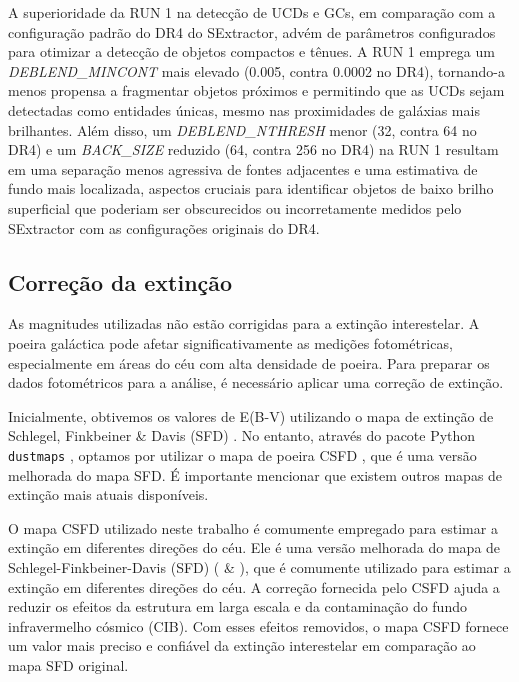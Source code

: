 A superioridade da RUN 1 na detecção de UCDs e GCs, em comparação com a configuração padrão do DR4 do SExtractor, advém de parâmetros configurados para otimizar a detecção de objetos compactos e tênues. A RUN 1 emprega um \textit{DEBLEND\_MINCONT} mais elevado (0.005, contra 0.0002 no DR4), tornando-a menos propensa a fragmentar objetos próximos e permitindo que as UCDs sejam detectadas como entidades únicas, mesmo nas proximidades de galáxias mais brilhantes. Além disso, um \textit{DEBLEND\_NTHRESH} menor (32, contra 64 no DR4) e um \textit{BACK\_SIZE} reduzido (64, contra 256 no DR4) na RUN 1 resultam em uma separação menos agressiva de fontes adjacentes e uma estimativa de fundo mais localizada, aspectos cruciais para identificar objetos de baixo brilho superficial que poderiam ser obscurecidos ou incorretamente medidos pelo SExtractor com as configurações originais do DR4.

\subsection{Correção da extinção}\label{sec:Coeficientes_ext}

As magnitudes utilizadas não estão corrigidas para a extinção interestelar. A poeira galáctica pode afetar significativamente as medições fotométricas, especialmente em áreas do céu com alta densidade de poeira. Para preparar os dados fotométricos para a análise, é necessário aplicar uma correção de extinção.

Inicialmente, obtivemos os valores de E(B-V) utilizando o mapa de extinção de Schlegel, Finkbeiner \& Davis (SFD) \citep{Schlegel_1998}. No entanto, através do pacote Python \texttt{dustmaps} \citep{dustmapsGreen2018}, optamos por utilizar o mapa de poeira CSFD \citep{chiang2023correctedsfdaccurategalactic}, que é uma versão melhorada do mapa SFD. É importante mencionar que existem outros mapas de extinção mais atuais disponíveis.

O mapa CSFD utilizado neste trabalho é comumente empregado para estimar a extinção em diferentes direções do céu. Ele é uma versão melhorada do mapa de Schlegel-Finkbeiner-Davis (SFD) (\citealt{Schlegel_1998} \& \citealt{Schlafly_2011}), que é comumente utilizado para estimar a extinção em diferentes direções do céu. A correção fornecida pelo CSFD ajuda a reduzir os efeitos da estrutura em larga escala e da contaminação do fundo infravermelho cósmico (CIB). Com esses efeitos removidos, o mapa CSFD fornece um valor mais preciso e confiável da extinção interestelar em comparação ao mapa SFD original.

